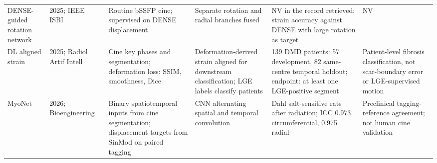 \documentclass[11pt,a4paper]{article}
\begin{document}
{\begin{longtable}{L{0.11\textwidth}L{0.115\textwidth}L{0.16\textwidth}L{0.185\textwidth}L{0.205\textwidth}L{0.165\textwidth}}
\addlinespace
DENSE-guided rotation network & 2025; IEEE ISBI~\cite{lei2025denserotation} & Routine bSSFP cine; supervised on DENSE displacement & Separate rotation and radial branches fused & NV in the record retrieved; strain accuracy against DENSE with large rotation as target & NV \\
\addlinespace
DL aligned strain & 2025; Radiol Artif Intell~\cite{koehler2025alignedstrain} & Cine key phases and segmentation; deformation loss: SSIM, smoothness, Dice & Deformation-derived strain aligned for downstream classification; LGE labels classify patients & 139 DMD patients: 57 development, 82 same-centre temporal holdout; endpoint: at least one LGE-positive segment & Patient-level fibrosis classification, not scar-boundary error or LGE-supervised motion \\
\addlinespace
MyoNet & 2026; Bio\-engineering~\cite{an2026myonet} & Binary spatiotemporal inputs from cine segmentation; displacement targets from SinMod on paired tagging & CNN alternating spatial and temporal convolution & Dahl salt-sensitive rats after radiation; ICC 0.973 circumferential, 0.975 radial & Preclinical tagging-reference agreement; not human cine validation \\
\bottomrule
\end{longtable}
}



\end{document}
